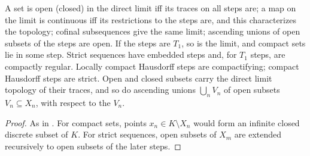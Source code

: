 \begin{theorem}
  \label{thm:top-dl-basic}
  \leanok
  A set is open (closed) in the direct limit iff its traces on all steps are; a map on the limit is
  continuous iff its restrictions to the steps are, and this characterizes the topology; cofinal
  subsequences give the same limit; ascending unions of open subsets of the steps are open. If the
  steps are $T_1$, so is the limit, and compact sets lie in some step. Strict sequences have
  embedded steps and, for $T_1$ steps, are compactly regular. Locally compact Hausdorff steps are
  compactifying; compact Hausdorff steps are strict. Open and closed subsets carry the direct limit
  topology of their traces, and so do ascending unions $\bigcup_n V_n$ of open subsets
  $V_n \subseteq X_n$, with respect to the $V_n$.
\end{theorem}

\begin{proof}
  \leanok
  As in \cite{GN26}. For compact sets, points $x_n \in K \setminus X_n$ would form an infinite
  closed discrete subset of $K$. For strict sequences, open subsets of $X_m$ are extended
  recursively to open subsets of the later steps.
\end{proof}

